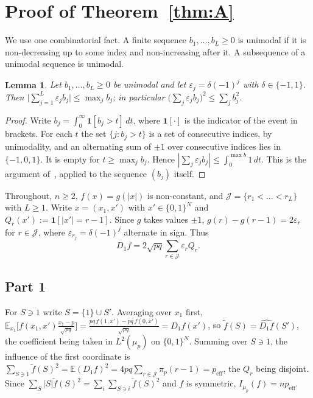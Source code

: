 \documentclass[11pt]{amsart}
\newtheorem{lemma}{Lemma}[section]
\theoremstyle{remark}
\newcommand{\peff}{p_{\mathrm{eff}}}
\newcommand{\J}{\mathcal{J}}
\newcommand{\ft}{\tilde f}
\begin{document}
\section{Proof of Theorem~\ref{thm:A}}\label{sec:A}

We use one combinatorial fact. A finite sequence $b_1, \dots, b_L \ge 0$ is unimodal if it is non-decreasing up to some index and non-increasing after it. A subsequence of a unimodal sequence is unimodal.

\begin{lemma}\label{lem:unimodal}
Let $b_1, \dots, b_L \ge 0$ be unimodal and let $\varepsilon_j = \delta(-1)^j$ with $\delta \in \{-1, 1\}$. Then $\bigl|\sum_{j=1}^L \varepsilon_j b_j\bigr| \le \max_j b_j$; in particular $\bigl(\sum_j \varepsilon_j b_j\bigr)^2 \le \sum_j b_j^2$.
\end{lemma}

\begin{proof}
Write $b_j = \int_0^\infty \mathbf{1}[b_j > t]\, dt$, where $\mathbf{1}[\cdot]$ is the indicator of the event in brackets. For each $t$ the set $\{j : b_j > t\}$ is a set of consecutive indices, by unimodality, and an alternating sum of $\pm 1$ over consecutive indices lies in $\{-1, 0, 1\}$. It is empty for $t \ge \max_j b_j$. Hence $|\sum_j \varepsilon_j b_j| \le \int_0^{\max b} 1\, dt$. This is the argument of~\cite[Lemma~3.1]{Shm26sym}, applied to the sequence $(b_j)$ itself.
\end{proof}

Throughout, $n \ge 2$, $f(x) = g(|x|)$ is non-constant, and $\J = \{r_1 < \dots < r_L\}$ with $L \ge 1$. Write $x = (x_1, x')$ with $x' \in \{0,1\}^N$ and $Q_r(x') := \mathbf{1}[|x'| = r-1]$. Since $g$ takes values $\pm 1$, $g(r) - g(r-1) = 2\varepsilon_r$ for $r \in \J$, where $\varepsilon_{r_j} = \delta(-1)^j$ alternate in sign. Thus
\begin{equation}\label{eq:D1}
D_1 f = 2\sqrt{pq} \sum_{r \in \J} \varepsilon_r Q_r .
\end{equation}

\subsection{Part 1}
For $S \ni 1$ write $S = \{1\} \cup S'$. Averaging over $x_1$ first, $\mathbb{E}_{x_1}\bigl[f(x_1, x')\frac{x_1 - p}{\sqrt{pq}}\bigr] = \frac{pq\, f(1,x') - pq\, f(0,x')}{\sqrt{pq}} = D_1 f(x')$, so $\ft(S) = \widehat{D_1 f}(S')$, the coefficient being taken in $L^2(\mu_p)$ on $\{0,1\}^N$. Summing over $S \ni 1$, the influence of the first coordinate is $\sum_{S \ni 1} \ft(S)^2 = \mathbb{E}(D_1 f)^2 = 4pq \sum_{r \in \J} \pi_p(r-1) = \peff$, the $Q_r$ being disjoint. Since $\sum_S |S| \ft(S)^2 = \sum_i \sum_{S \ni i} \ft(S)^2$ and $f$ is symmetric, $I_{\mu_p}(f) = n \peff$.
\end{document}
